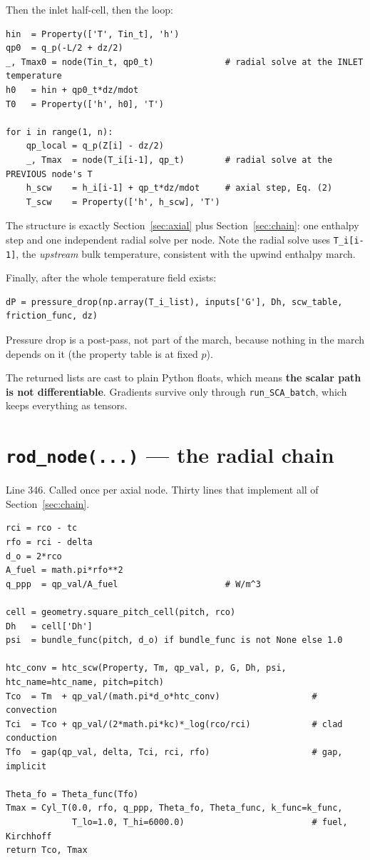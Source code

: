 \documentclass[11pt]{article}
\newcommand{\code}[1]{\texttt{#1}}
\begin{document}
Then the inlet half-cell, then the loop:

\begin{lstlisting}
hin  = Property(['T', Tin_t], 'h')
qp0  = q_p(-L/2 + dz/2)
_, Tmax0 = node(Tin_t, qp0_t)              # radial solve at the INLET temperature
h0   = hin + qp0_t*dz/mdot
T0   = Property(['h', h0], 'T')

for i in range(1, n):
    qp_local = q_p(Z[i] - dz/2)
    _, Tmax  = node(T_i[i-1], qp_t)        # radial solve at the PREVIOUS node's T
    h_scw    = h_i[i-1] + qp_t*dz/mdot     # axial step, Eq. (2)
    T_scw    = Property(['h', h_scw], 'T')
\end{lstlisting}

The structure is exactly Section~\ref{sec:axial} plus Section~\ref{sec:chain}: one
enthalpy step and one independent radial solve per node. Note the radial solve uses
\code{T\_i[i-1]}, the \emph{upstream} bulk temperature, consistent with the upwind
enthalpy march.

Finally, after the whole temperature field exists:
\begin{lstlisting}
dP = pressure_drop(np.array(T_i_list), inputs['G'], Dh, scw_table, friction_func, dz)
\end{lstlisting}
Pressure drop is a post-pass, not part of the march, because nothing in the march depends
on it (the property table is at fixed $p$).

The returned lists are cast to plain Python floats, which means \textbf{the scalar path
is not differentiable}. Gradients survive only through \code{run\_SCA\_batch}, which
keeps everything as tensors.

\section{\code{rod\_node(...)} --- the radial chain}
Line 346. Called once per axial node. Thirty lines that implement all of
Section~\ref{sec:chain}.

\begin{lstlisting}
rci = rco - tc
rfo = rci - delta
d_o = 2*rco
A_fuel = math.pi*rfo**2
q_ppp  = qp_val/A_fuel                     # W/m^3

cell = geometry.square_pitch_cell(pitch, rco)
Dh   = cell['Dh']
psi  = bundle_func(pitch, d_o) if bundle_func is not None else 1.0

htc_conv = htc_scw(Property, Tm, qp_val, p, G, Dh, psi, htc_name=htc_name, pitch=pitch)
Tco  = Tm  + qp_val/(math.pi*d_o*htc_conv)                  # convection
Tci  = Tco + qp_val/(2*math.pi*kc)*_log(rco/rci)            # clad conduction
Tfo  = gap(qp_val, delta, Tci, rci, rfo)                    # gap, implicit

Theta_fo = Theta_func(Tfo)
Tmax = Cyl_T(0.0, rfo, q_ppp, Theta_fo, Theta_func, k_func=k_func,
             T_lo=1.0, T_hi=6000.0)                         # fuel, Kirchhoff
return Tco, Tmax
\end{lstlisting}
\end{document}
